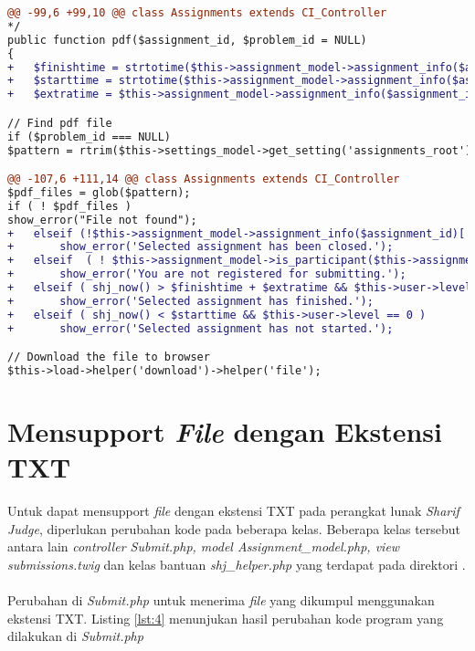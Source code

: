 \begin{lstlisting}[language=diff, caption=Perubahan kode program pada \textit{Assignments.php}, label=lst:3, basicstyle=\ttfamily, frame=single,
columns=fullflexible, keepspaces=true, breaklines=true]
@@ -99,6 +99,10 @@ class Assignments extends CI_Controller
*/
public function pdf($assignment_id, $problem_id = NULL)
{
+   $finishtime = strtotime($this->assignment_model->assignment_info($assignment_id)['finish_time']);
+   $starttime = strtotime($this->assignment_model->assignment_info($assignment_id)['start_time']);
+   $extratime = $this->assignment_model->assignment_info($assignment_id)['extra_time'];

// Find pdf file
if ($problem_id === NULL)
$pattern = rtrim($this->settings_model->get_setting('assignments_root'),'/')."/assignment_{$assignment_id}/*.pdf";

@@ -107,6 +111,14 @@ class Assignments extends CI_Controller
$pdf_files = glob($pattern);
if ( ! $pdf_files )
show_error("File not found");
+   elseif (!$this->assignment_model->assignment_info($assignment_id)['open'] && $this->user->level == 0 )
+       show_error('Selected assignment has been closed.');
+   elseif  ( ! $this->assignment_model->is_participant($this->assignment_model->assignment_info($assignment_id)['participants'],$this->user->username) )
+       show_error('You are not registered for submitting.');
+   elseif ( shj_now() > $finishtime + $extratime && $this->user->level == 0 )
+       show_error('Selected assignment has finished.');
+   elseif ( shj_now() < $starttime && $this->user->level == 0 )
+       show_error('Selected assignment has not started.');

// Download the file to browser
$this->load->helper('download')->helper('file');
\end{lstlisting}

\section{Mensupport \textit{File} dengan Ekstensi TXT}
Untuk dapat mensupport \textit{file} dengan ekstensi TXT pada perangkat lunak \textit{Sharif Judge}, diperlukan perubahan kode pada beberapa kelas. Beberapa kelas tersebut antara lain \textit{controller Submit.php, model Assignment\_model.php, view submissions.twig} dan kelas bantuan \textit{shj\_helper.php} yang terdapat pada direktori .
~\\
Perubahan di \textit{Submit.php} untuk menerima \textit{file} yang dikumpul menggunakan ekstensi TXT. Listing \ref{lst:4} menunjukan hasil perubahan kode program yang dilakukan di \textit{Submit.php}

